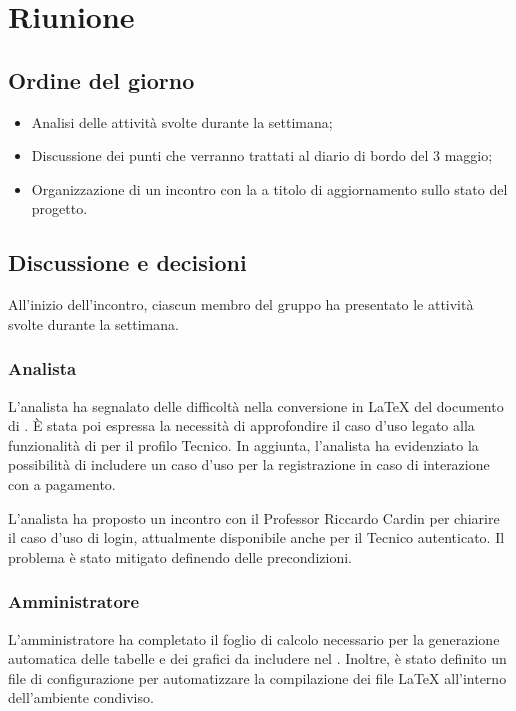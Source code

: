 \section{Riunione}
\subsection{Ordine del giorno}
\begin{itemize}
	\item Analisi delle attività svolte durante la settimana;
	\item Discussione dei punti che verranno trattati al diario di bordo del 3 maggio;
	\item Organizzazione di un incontro con la  a titolo di aggiornamento sullo stato del progetto.
\end{itemize}

\subsection{Discussione e decisioni}
\par All'inizio dell'incontro, ciascun membro del gruppo ha presentato le attività svolte durante la settimana.

\subsubsection{Analista}
\par L'analista ha segnalato delle difficoltà nella conversione in LaTeX del documento di \AdR. È stata poi espressa la necessità di approfondire il caso d'uso legato alla funzionalità di  per il profilo Tecnico. In aggiunta, l’analista ha evidenziato la possibilità di includere un caso d’uso per la registrazione in caso di interazione con  a pagamento.

\par L'analista ha proposto un incontro con il Professor Riccardo Cardin per chiarire il caso d’uso di login, attualmente disponibile anche per il Tecnico autenticato. Il problema è stato mitigato definendo delle precondizioni.

\subsubsection{Amministratore}
\par L'amministratore ha completato il foglio di calcolo necessario per la generazione automatica delle tabelle e dei grafici da includere nel \PdP. Inoltre, è stato definito un file di configurazione per automatizzare la compilazione dei file LaTeX all'interno dell'ambiente condiviso.

